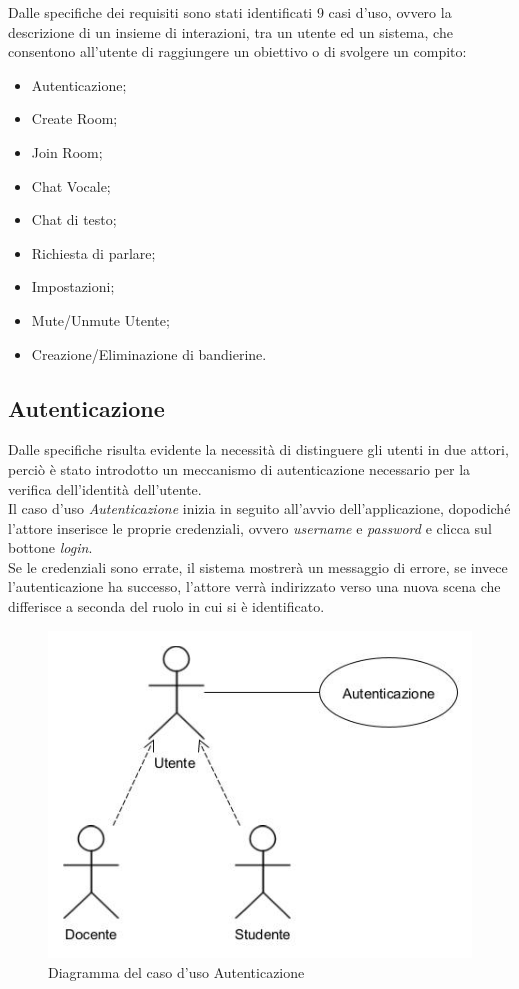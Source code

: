 \hspace*{-0.6cm}Dalle specifiche dei requisiti sono stati identificati 9 casi d'uso, ovvero la descrizione di un insieme di interazioni, tra un utente ed un sistema, che consentono all'utente di raggiungere un obiettivo o di svolgere un compito:
\begin{itemize}
\item Autenticazione;
\item Create Room;
\item Join Room;
\item Chat Vocale;
\item Chat di testo;
\item Richiesta di parlare;
\item Impostazioni;
\item Mute/Unmute Utente;
\item Creazione/Eliminazione di bandierine.
\end{itemize}
\subsection{Autenticazione}
Dalle specifiche risulta evidente  la  necessità  di  distinguere  gli utenti  in  due  attori, perciò è stato introdotto un meccanismo di autenticazione necessario per la verifica dell'identità dell'utente.
\\Il caso d'uso \textit{Autenticazione} inizia in seguito all'avvio dell'applicazione, dopodiché l'attore inserisce le proprie credenziali, ovvero \textit{username} e \textit{password} e clicca sul bottone \textit{login}.
\\Se le credenziali sono errate, il sistema mostrerà un messaggio di errore, se invece l'autenticazione ha successo, l'attore verrà indirizzato verso una nuova scena che differisce a seconda del ruolo in cui si è identificato.
\begin{figure}[H]
    \centering
    \includegraphics[scale=0.5]{Immagini/LoginUseCase.jpg}
    \caption{Diagramma del caso d'uso Autenticazione}
    \label{fig:my_label}
\end{figure}
